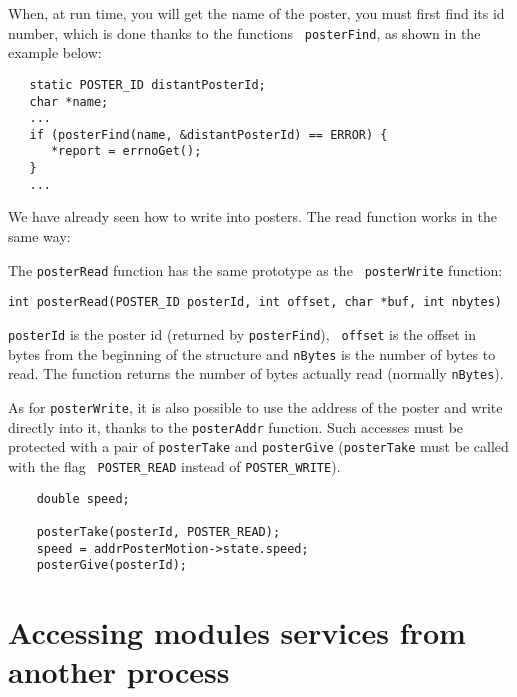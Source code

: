 When, at run time,  you will get the  name of the  poster, you must first
find  its id  number,  which   is done  thanks   to the   functions  {\tt
posterFind}, as shown in the example below:

\begin{center}\begin{cartouche}\small\begin{verbatim}
   static POSTER_ID distantPosterId;
   char *name;
   ...
   if (posterFind(name, &distantPosterId) == ERROR) {
      *report = errnoGet();
   }
   ...
\end{verbatim}\end{cartouche}\end{center}

We have  already seen how to write  into posters. The read function works
in the same way:

The   {\tt  posterRead} function   has the  same    prototype as the {\tt
posterWrite} function:

\bigbreak
{\tt int posterRead(POSTER\_ID posterId, int offset, char *buf, int nbytes)}
\bigbreak

{\tt  posterId} is  the poster id   (returned by {\tt posterFind}),  {\tt
offset} is the offset  in bytes from  the beginning of the structure  and
{\tt  nBytes} is the number  of bytes to read.   The function returns the
number of bytes actually read (normally {\tt nBytes}).

As for {\tt posterWrite},  it is also possible to  use the address of the
poster and   write  directly into  it,  thanks  to  the {\tt  posterAddr}
function. Such accesses must be protected with a pair of {\tt posterTake}
and {\tt posterGive} ({\tt posterTake} must be  called with the flag {\tt
POSTER\_READ} instead of {\tt POSTER\_WRITE}).

\begin{center}\begin{cartouche}\small\begin{verbatim}
    double speed;

    posterTake(posterId, POSTER_READ);
    speed = addrPosterMotion->state.speed;
    posterGive(posterId);
\end{verbatim}\end{cartouche}\end{center}



\section{Accessing modules services from another process}

